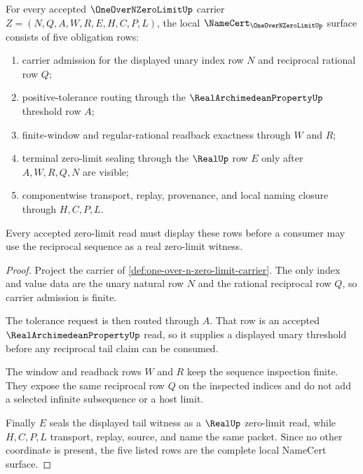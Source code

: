 \begin{theorem}
\label{thm:one-over-n-zero-limit-namecert-obligations}
For every accepted $\OneOverNZeroLimitUp$ carrier $Z=(N,Q,A,W,R,E,H,C,P,L)$, the local $\NameCert_{\OneOverNZeroLimitUp}$ surface consists of five obligation rows:
\begin{enumerate}
\item carrier admission for the displayed unary index row $N$ and reciprocal rational row $Q$;
\item positive-tolerance routing through the $\RealArchimedeanPropertyUp$ threshold row $A$;
\item finite-window and regular-rational readback exactness through $W$ and $R$;
\item terminal zero-limit sealing through the $\RealUp$ row $E$ only after $A,W,R,Q,N$ are visible;
\item componentwise transport, replay, provenance, and local naming closure through $H,C,P,L$.
\end{enumerate}
Every accepted zero-limit read must display these rows before a consumer may use the reciprocal sequence as a real zero-limit witness.
\end{theorem}
\begin{proof}
Project the carrier of \autoref{def:one-over-n-zero-limit-carrier}. The only index and value data are the unary natural row $N$ and the rational reciprocal row $Q$, so carrier admission is finite.

The tolerance request is then routed through $A$. That row is an accepted $\RealArchimedeanPropertyUp$ read, so it supplies a displayed unary threshold before any reciprocal tail claim can be consumed.

The window and readback rows $W$ and $R$ keep the sequence inspection finite. They expose the same reciprocal row $Q$ on the inspected indices and do not add a selected infinite subsequence or a host limit.

Finally $E$ seals the displayed tail witness as a $\RealUp$ zero-limit read, while $H,C,P,L$ transport, replay, source, and name the same packet. Since no other coordinate is present, the five listed rows are the complete local NameCert surface.
\end{proof}

